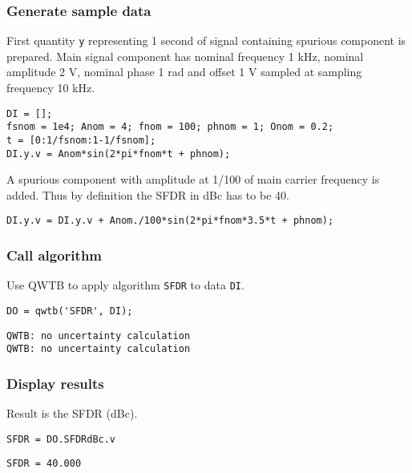 \startcontents[localtoc]



{}
\subsubsection*{Generate sample data}



First quantity \texttt{y} representing 1 second of signal containing spurious component is prepared. Main
signal component has nominal frequency 1 kHz, nominal amplitude 2 V, nominal phase 1 rad and
offset 1 V sampled at sampling frequency 10 kHz.

\begin{lstlisting}
DI = [];
fsnom = 1e4; Anom = 4; fnom = 100; phnom = 1; Onom = 0.2;
t = [0:1/fsnom:1-1/fsnom];
DI.y.v = Anom*sin(2*pi*fnom*t + phnom);
\end{lstlisting}


A spurious component with amplitude at 1/100 of main carrier frequency is added. Thus by
definition the SFDR in dBc has to be 40.

\begin{lstlisting}
DI.y.v = DI.y.v + Anom./100*sin(2*pi*fnom*3.5*t + phnom);
\end{lstlisting}


{}
\subsubsection*{Call algorithm}



Use QWTB to apply algorithm \texttt{SFDR} to data \texttt{DI}.

\begin{lstlisting}
DO = qwtb('SFDR', DI);
\end{lstlisting}
\begin{lstlisting}[language={},xleftmargin=5pt,frame=none]
QWTB: no uncertainty calculation
QWTB: no uncertainty calculation

\end{lstlisting}


{}
\subsubsection*{Display results}



Result is the SFDR (dBc).

\begin{lstlisting}
SFDR = DO.SFDRdBc.v
\end{lstlisting}
\begin{lstlisting}[language={},xleftmargin=5pt,frame=none]
SFDR = 40.000

\end{lstlisting}


\stopcontents[localtoc]
